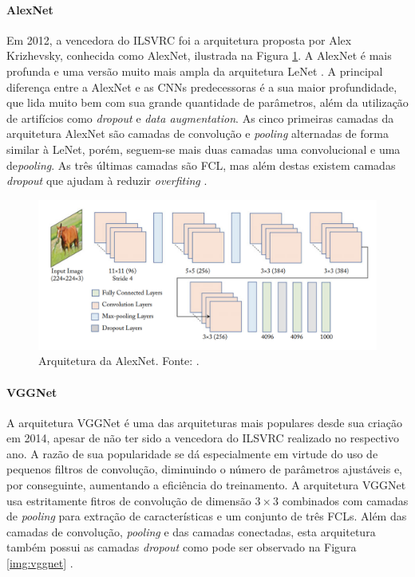 \paragraph{AlexNet} Em 2012, a vencedora do ILSVRC foi a arquitetura proposta por Alex Krizhevsky, conhecida como AlexNet, ilustrada na Figura \ref{img:alexnet}. A AlexNet é mais profunda e uma versão muito mais ampla da arquitetura LeNet \cite{ref:satapathy}. A principal diferença entre a AlexNet e as CNNs predecessoras é a sua maior profundidade, que lida muito bem com sua grande quantidade de parâmetros, além da utilização de artifícios como \textit{dropout} e \textit{data augmentation}. As cinco primeiras camadas da arquitetura AlexNet são camadas de convolução e \textit{pooling} alternadas de forma similar à LeNet, porém, seguem-se mais duas camadas uma convolucional e uma de\textit{pooling}. As três últimas camadas são FCL, mas além destas existem camadas \textit{dropout} que ajudam à reduzir \textit{overfiting} \cite{ref:khan}. 

\begin{figure}[!ht]
	\centering
	\caption{Arquitetura da AlexNet. Fonte: \cite{ref:khan}.}
	\label{img:alexnet}
	\includegraphics[width=1\textwidth]{./img/alexnet}
\end{figure}

\paragraph{VGGNet} A arquitetura VGGNet é uma das arquiteturas mais populares desde sua criação em 2014, apesar de não ter sido a vencedora do ILSVRC realizado no respectivo ano. A razão de sua popularidade se dá especialmente em virtude do uso de pequenos filtros de convolução, diminuindo o número de parâmetros ajustáveis e, por conseguinte, aumentando a eficiência do treinamento. A arquitetura VGGNet usa estritamente fitros de convolução de dimensão $3 \times 3$ combinados com camadas de \textit{pooling} para extração de características e um conjunto de três FCLs. Além das camadas de convolução, \textit{pooling} e das camadas conectadas, esta arquitetura também possui as camadas \textit{dropout} como pode ser observado na Figura \ref{img:vggnet} \cite{ref:khan}.

